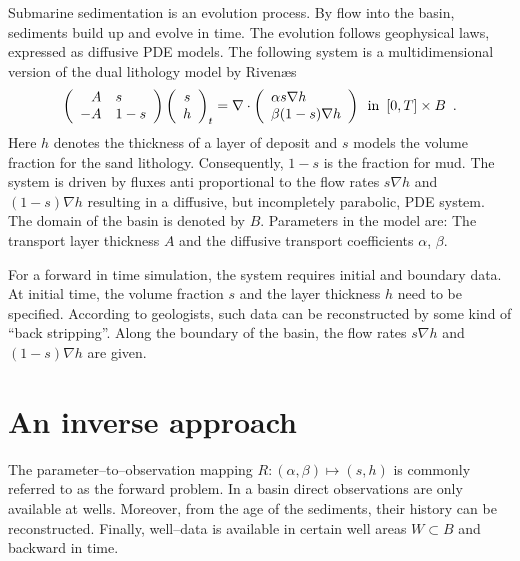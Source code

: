Submarine sedimentation is an evolution process.
By flow into the basin, sediments build up and evolve in time.
The evolution follows geophysical laws, expressed as diffusive PDE models.
The following system is a multidimensional version of the dual lithology model by Riven{\ae}s \cite{Riv92, Riv93}
\begin{equation} \label{model}
\left(\begin{array}{rl} A & s \\ -A & 1-s \end{array}\right)
\left(\begin{array}{c} s \\ h \end{array}\right)_t = 
\nabla \cdot \left( \begin{array}{l} \alpha s \nabla h \\ \beta (1-s) \nabla h \end{array} \right) 
\enspace \hbox{in} \enspace [0,T] \times B \enspace .
\end{equation}
Here $h$ denotes the thickness of a layer of deposit and 
$s$ models the volume fraction for the sand lithology.
Consequently, $1-s$ is the fraction for mud.
The system is driven by fluxes anti proportional to the flow rates 
$s \nabla h$ and $(1-s) \nabla h$
resulting in a diffusive, but incompletely parabolic, PDE system.
The domain of the basin is denoted by $B$.
Parameters in the model are: 
The transport layer thickness $A$ and the diffusive transport coefficients $\alpha$, $\beta$.

For a forward in time simulation, the system requires initial and boundary data.
At initial time, the volume fraction $s$ and the layer thickness $h$ need to be specified.
According to geologists, such data can be reconstructed by some kind of ``back stripping''.
Along the boundary of the basin, the flow rates $s \nabla h$ and $(1-s) \nabla h$ are given.

\section{An inverse approach}

The parameter--to--observation mapping 
$R: (\alpha, \beta) \mapsto (s, h)$
is commonly referred to as the forward problem.
In a basin direct observations are only available at wells.
Moreover, from the age of the sediments, their history can be reconstructed.
Finally, well--data is available in certain well areas $W \subset B$ and backward in time.

